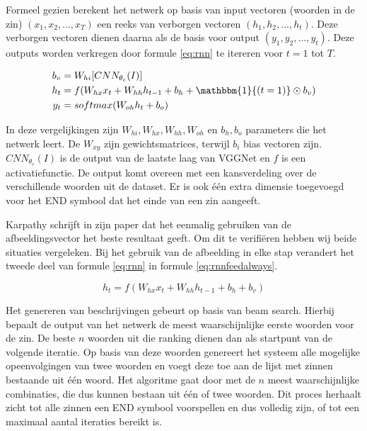 Formeel gezien berekent het netwerk op basis van input vectoren (woorden in de zin) $(x_1,x_2,...,x_T)$ een reeks van verborgen vectoren $(h_1,h_2,...,h_t)$. Deze verborgen vectoren dienen daarna als de basis voor output $(y_1,y_2,...,y_t)$. Deze outputs worden verkregen door formule \eqref{eq:rnn} te itereren voor $t = 1$ tot $T$.

\begin{equation}
\begin{aligned}
     b_v &= W_{hi} [CNN_{\theta_c}(I)] \\
     h_t &= f(W_{hx} x_{t} + W_{hh} h_{t-1} + b_h + \mathbbm{1}{(t=1)} \odot b_v) \\
     y_t &= softmax( W_{oh} h_t + b_o)
\end{aligned}
\label{eq:rnn}
\end{equation}

In deze vergelijkingen zijn $W_{hi}, W_{hx}, W_{hh}, W_{oh}$ en $b_h, b_o$ parameters die het netwerk leert. De $W_{xy}$ zijn gewichtsmatrices, terwijl $b_i$ bias vectoren zijn. $CNN_{\theta_c}(I)$ is de output van de laatste laag van VGGNet en $f$ is een activatiefunctie. De output komt overeen met een kansverdeling over de verschillende woorden uit de dataset. Er is ook \'e\'en extra dimensie toegevoegd voor het END symbool dat het einde van een zin aangeeft. 

Karpathy schrijft in zijn paper dat het eenmalig gebruiken van de afbeeldingsvector het beste resultaat geeft. Om dit te verifi\"eren hebben wij beide situaties vergeleken. Bij het gebruik van de afbeelding in elke stap verandert het tweede deel van formule \eqref{eq:rnn} in formule \eqref{eq:rnnfeedalways}.

\begin{equation}
     h_t = f(W_{hx} x_{t} + W_{hh} h_{t-1} + b_h + b_v)
\label{eq:rnnfeedalways}
\end{equation}

Het genereren van beschrijvingen gebeurt op basis van beam search. Hierbij bepaalt de output van het netwerk de meest waarschijnlijke eerste woorden voor de zin. De beste $n$ woorden uit die ranking dienen dan als startpunt van de volgende iteratie. Op basis van deze woorden genereert het systeem alle mogelijke opeenvolgingen van twee woorden en voegt deze toe aan de lijst met zinnen bestaande uit \'e\'en woord. Het algoritme gaat door met de $n$ meest waarschijnlijke combinaties, die dus kunnen bestaan uit \'e\'en of twee woorden. Dit proces herhaalt zicht tot alle zinnen een END symbool voorspellen en dus volledig zijn, of tot een maximaal aantal iteraties bereikt is. 
 

